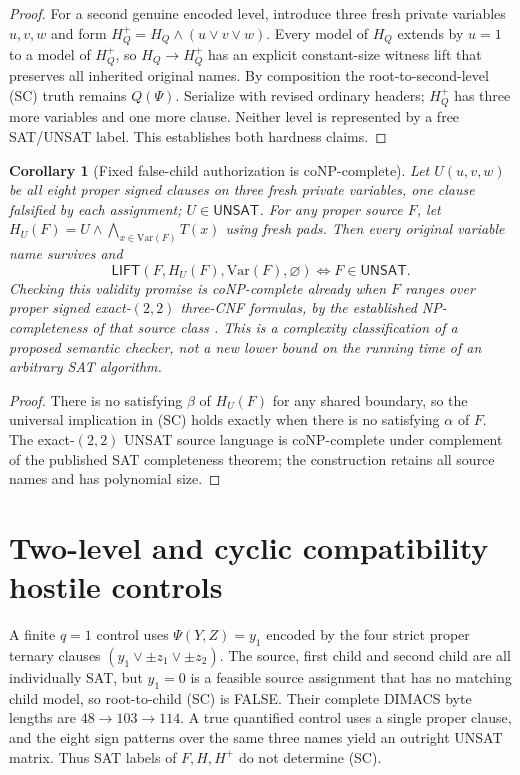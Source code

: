 \documentclass[11pt]{article}
\newtheorem{corollary}[theorem]{Corollary}
\newcommand{\UNSAT}{\mathsf{UNSAT}}
\newcommand{\Lift}{\mathsf{LIFT}}
\begin{document}
\begin{proof}
For a second genuine encoded level, introduce three fresh private variables $u,v,w$ and form $H_Q^{+}=H_Q\land(u\vee v\vee w)$. Every model of $H_Q$ extends by $u=1$ to a model of $H_Q^{+}$, so $H_Q\to H_Q^{+}$ has an explicit constant-size witness lift that preserves all inherited original names. By composition the root-to-second-level (SC) truth remains $Q(\Psi)$. Serialize with revised ordinary headers; $H_Q^+$ has three more variables and one more clause. Neither level is represented by a free SAT/UNSAT label. This establishes both hardness claims.
\end{proof}

\begin{corollary}[Fixed false-child authorization is coNP-complete]\label{co:fixed}
Let $U(u,v,w)$ be all eight proper signed clauses on three fresh private variables, one clause falsified by each assignment; $U\in\UNSAT$. For any proper source $F$, let $H_U(F)=U\land\bigwedge_{x\in\mathrm{Var}(F)}T(x)$ using fresh pads. Then every original variable name survives and
\[
\boxed{\Lift(F,H_U(F),\mathrm{Var}(F),\varnothing)\iff F\in\UNSAT.}
\]
Checking this validity promise is coNP-complete already when $F$ ranges over proper signed exact-$(2,2)$ three-CNF formulas, by the established NP-completeness of that source class \cite{Docker2019}. This is a \emph{complexity classification of a proposed semantic checker}, not a new lower bound on the running time of an arbitrary SAT algorithm.
\end{corollary}
\begin{proof}
There is no satisfying $\beta$ of $H_U(F)$ for any shared boundary, so the universal implication in (SC) holds exactly when there is no satisfying $\alpha$ of $F$. The exact-$(2,2)$ UNSAT source language is coNP-complete under complement of the published SAT completeness theorem; the construction retains all source names and has polynomial size.\end{proof}

\section{Two-level and cyclic compatibility hostile controls}
A finite $q=1$ control uses $\Psi(Y,Z)=y_1$ encoded by the four strict proper ternary clauses $(y_1\vee\pm z_1\vee\pm z_2)$. The source, first child and second child are all individually SAT, but $y_1=0$ is a feasible source assignment that has no matching child model, so root-to-child (SC) is FALSE. Their complete DIMACS byte lengths are $48\to103\to114$. A true quantified control uses a single proper clause, and the eight sign patterns over the same three names yield an outright UNSAT matrix. Thus SAT labels of $F,H,H^+$ do not determine (SC).
\end{document}
